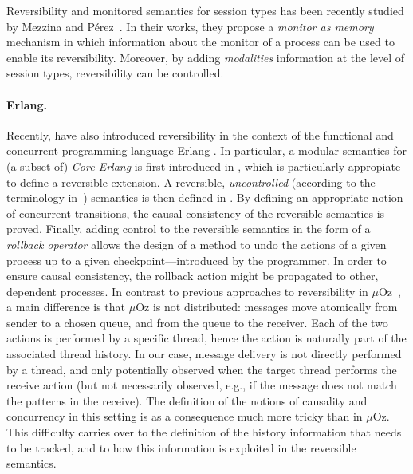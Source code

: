 \documentclass[a4paper,oneside]{article}
\begin{document}
 Reversibility and monitored semantics for session types has been recently studied by Mezzina and  P\'erez~\cite{MezzinaP16a,MezzinaP16b}. In their works, they propose a \textit{monitor as memory} mechanism in which information about the monitor of a process can be used to enable its reversibility. Moreover, by adding \textit{modalities} information at the level of session types, reversibility can be controlled.
 
 \paragraph{Erlang.}
Recently, \cite{NPV16,LNPV17} have also introduced reversibility in the
context of the functional and concurrent programming language Erlang
\cite{AVW96}. In particular, a modular semantics for (a subset of)
\emph{Core Erlang} \cite{CGJLNPV04} is first introduced in
\cite{NPV16}, which is particularly appropiate to define a reversible
extension. A reversible, \emph{uncontrolled} (according to the
terminology in~\cite{LMT14}) semantics is then defined in
\cite{LNPV17}. By defining an appropriate notion of concurrent
transitions, the causal consistency of the reversible semantics is
proved. Finally, adding control to the reversible semantics in the
form of a \emph{rollback operator} allows the design of a method to
undo the actions of a given process up to a given
checkpoint---introduced by the programmer. In order to ensure
causal consistency, the rollback action might be propagated to other,
dependent processes.
%
In contrast to previous approaches to reversibility in
$\mu$Oz~\cite{LLMS12,GLM14}, a main difference is that $\mu$Oz is not
distributed: messages move atomically from sender to a chosen queue,
and from the queue to the receiver. Each of the two actions is
performed by a specific thread, hence the action is naturally part of
the associated thread history. In our case, message delivery is not
directly performed by a thread, and only potentially observed when the
target thread performs the receive action (but not necessarily
observed, e.g., if the message does not match the patterns in the
receive). The definition of the notions of causality and concurrency
in this setting is as a consequence much more tricky than in
$\mu$Oz. This difficulty carries over to the definition of the history
information that needs to be tracked, and to how this information is
exploited in the reversible semantics.
\end{document}
